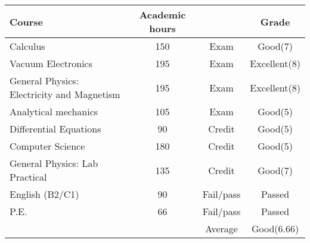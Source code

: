 \documentclass[a4paper]{article}
\newcommand{\upperRomannumeral}[1]{\uppercase\expandafter{\romannumeral#1}}
\begin{document}
\begin{tabular}{|p{6cm}|c|c|c|}
\hline
\textbf{Course}&\textbf{Academic hours}& &\textbf{Grade}\\
\hline
Calculus \upperRomannumeral{3} & 150 & Exam & Good(7)\\

Vacuum Electronics & 195 & Exam & Excellent(8)\\

General Physics: Electricity and Magnetism & 195 & Exam & Excellent(8)\\

Analytical mechanics & 105 & Exam & Good(5)\\

Differential Equations & 90 & Credit & Good(5)\\

Computer Science & 180 & Credit & Good(5)\\

General Physics: Lab Practical & 135 & Credit & Good(7)\\

English (B2/C1) & 90 & Fail/pass & Passed\\

P.E.& 66 & Fail/pass & Passed \\
\hline
&& Average & Good(6.66)\\
\hline
\end{tabular}\\ \\
\end{document}

